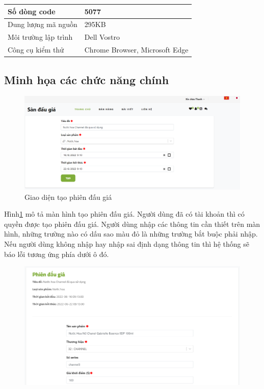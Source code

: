 \documentclass[../DoAn.tex]{subfiles}
\begin{document}
    \tabletail{\hline}
    \label{bang412}
    \begin{supertabular}{| p{.45\textwidth}| p{.45\textwidth} |} 
    \hline
        Số dòng code& 5077\\\hline
        Dung lượng mã nguồn&295KB \\\hline
        Môi trường lập trình&Dell Vostro \\\hline
        Công cụ kiểm thử & Chrome Browser, Microsoft Edge\\\hline
    \end{supertabular}
\subsection{Minh họa các chức năng chính}
\begin{figure}[H]
    \centering
    \includegraphics[width=0.75\linewidth,height=4.86cm]{Hinhve/createauctiondemo.png}
    \caption{Giao diện tạo phiên đấu giá}
    \label{fig:Fig414}
\end{figure}
Hình\ref{fig:Fig414} mô tả màn hình tạo phiên đấu giá. Người dùng đã có tài khoản thì có quyền được tạo phiên đấu giá. Người dùng nhập các thông tin cần thiết trên màn hình, những trường nào có dấu sao màu đỏ là những trường bắt buộc phải nhập. Nếu người dùng không nhập hay nhập sai định dạng thông tin thì hệ thống sẽ báo lỗi tương ứng phía dưới ô đó. 
\begin{figure}[H]
    \centering
    \includegraphics[width=0.75\linewidth,height=6.16cm]{Hinhve/createitem1demo.png}
    \label{fig:Fig4151}
\end{figure}
\end{document}
